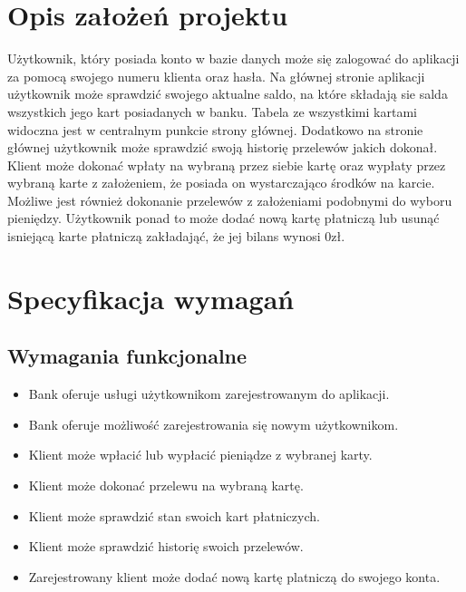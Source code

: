 \documentclass[12pt, letterpaper]{article}
\begin{document}
\newpage

\tableofcontents

\newpage

\section{Opis założeń projektu}

\quad Użytkownik, który posiada konto w bazie danych może się zalogować do aplikacji za pomocą swojego numeru klienta oraz hasła. Na głównej stronie aplikacji użytkownik może sprawdzić swojego aktualne saldo, na które składają sie salda wszystkich jego kart posiadanych w banku. Tabela ze wszystkimi kartami widoczna jest w centralnym punkcie strony głównej. Dodatkowo na stronie głównej użytkownik może sprawdzić swoją historię przelewów jakich dokonał. Klient może dokonać wpłaty na wybraną przez siebie kartę oraz wypłaty przez wybraną karte z założeniem, że posiada on wystarczająco środków na karcie. Możliwe jest również dokonanie przelewów z założeniami podobnymi do wyboru pieniędzy. Użytkownik ponad to może dodać nową kartę płatniczą lub usunąć isniejącą karte płatniczą zakładająć, że jej bilans wynosi 0zł.

\section{Specyfikacja wymagań}

\subsection{Wymagania funkcjonalne}
\begin{itemize}
\item Bank oferuje usługi użytkownikom zarejestrowanym do aplikacji.
\item Bank oferuje możliwość zarejestrowania się nowym użytkownikom.
\item Klient może wpłacić lub wypłacić pieniądze z wybranej karty.
\item Klient może dokonać przelewu na wybraną kartę.
\item Klient może sprawdzić stan swoich kart płatniczych.
\item Klient może sprawdzić historię swoich przelewów.
\item Zarejestrowany klient może dodać nową kartę platniczą do swojego konta.
\end{itemize}
\end{document}
